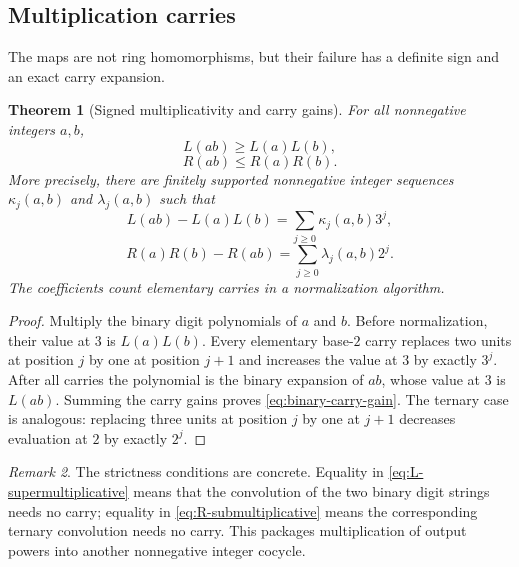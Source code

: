 \documentclass[11pt]{article}
\newtheorem{theorem}{Theorem}[section]
\theoremstyle{definition}
\theoremstyle{remark}
\newtheorem{remark}[theorem]{Remark}
\begin{document}
\subsection{Multiplication carries}

The maps are not ring homomorphisms, but their failure has a definite sign and an
exact carry expansion.

\begin{theorem}[Signed multiplicativity and carry gains]
\label{thm:signed-multiplicativity}
For all nonnegative integers $a,b$,
\begin{equation}\label{eq:L-supermultiplicative}
 L(ab)\ge L(a)L(b),
\end{equation}
\begin{equation}\label{eq:R-submultiplicative}
 R(ab)\le R(a)R(b).
\end{equation}
More precisely, there are finitely supported nonnegative integer sequences
$\kappa_j(a,b)$ and $\lambda_j(a,b)$ such that
\begin{equation}\label{eq:binary-carry-gain}
 L(ab)-L(a)L(b)=\sum_{j\ge0}\kappa_j(a,b)3^j,
\end{equation}
\begin{equation}\label{eq:ternary-carry-loss}
 R(a)R(b)-R(ab)=\sum_{j\ge0}\lambda_j(a,b)2^j.
\end{equation}
The coefficients count elementary carries in a normalization algorithm.
\end{theorem}

\begin{proof}
Multiply the binary digit polynomials of $a$ and $b$.  Before normalization, their
value at $3$ is $L(a)L(b)$.  Every elementary base-$2$ carry replaces two units at
position $j$ by one at position $j+1$ and increases the value at $3$ by exactly
$3^j$.  After all carries the polynomial is the binary expansion of $ab$, whose
value at $3$ is $L(ab)$.  Summing the carry gains proves
\eqref{eq:binary-carry-gain}.  The ternary case is analogous: replacing three units
at position $j$ by one at $j+1$ decreases evaluation at $2$ by exactly $2^j$.
\end{proof}

\begin{remark}
The strictness conditions are concrete.  Equality in \eqref{eq:L-supermultiplicative}
means that the convolution of the two binary digit strings needs no carry; equality
in \eqref{eq:R-submultiplicative} means the corresponding ternary convolution needs
no carry.  This packages multiplication of output powers into another nonnegative
integer cocycle.
\end{remark}
\end{document}
